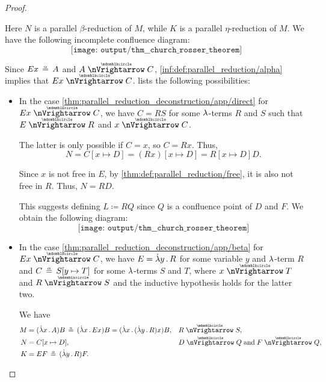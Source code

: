 \begin{proof}
\begin{itemize}
\begin{itemize}
\begin{itemize}
        Here \( N \) is a parallel \( \beta \)-reduction of \( M \), while \( K \) is a parallel \( \eta \)-reduction of \( M \). We have the following incomplete confluence diagram:
        \begin{equation*}
          \texttt{[image: output/thm\_\_church\_rosser\_theorem]}
        \end{equation*}

        Since \( Ex \aequiv A \) and \( A \ppred C \), \ref{inf:def:parallel_reduction/alpha} implies that \( Ex \ppred C \).  lists the following possibilities:
        \begin{itemize}
          \item In the case \cref{thm:parallel_reduction_deconstruction/app/direct} for \( Ex \ppred C \), we have \( C = RS \) for some \( {\mathrm \lambda} \)-terms \( R \) and \( S \) such that \( E \ppred R \) and \( x \ppred C \).

          The latter is only possible if \( C = x \), so \( C = Rx \). Thus,
          \begin{equation*}
            N = C[x \mapsto D] = (Rx)[x \mapsto D] = R[x \mapsto D] D.
          \end{equation*}

          Since \( x \) is not free in \( E \), by \cref{thm:def:parallel_reduction/free}, it is also not free in \( R \). Thus, \( N = RD \).

          This suggests defining \( L \coloneqq RQ \) since \( Q \) is a confluence point of \( D \) and \( F \). We obtain the following diagram:
          \begin{equation*}
            \texttt{[image: output/thm\_\_church\_rosser\_theorem]}
          \end{equation*}

          \item In the case \cref{thm:parallel_reduction_deconstruction/app/beta} for \( Ex \ppred C \), we have \( E = \qabs y R \) for some variable \( y \) and \( {\mathrm \lambda} \)-term \( R \) and \( C \aequiv S[y \mapsto T] \) for some \( {\mathrm \lambda} \)-terms \( S \) and \( T \), where \( x \ppred T \) and \( R \ppred S \) and the inductive hypothesis holds for the latter two.

          We have
          \begin{align*}
            M &= (\qabs x A) B \aequiv (\qabs x E x) B = (\qabs x (\qabs y R) x) B, &&R \ppred S, \\
            N &= C[x \mapsto D],                                                    &&D \ppred Q \T{and} F \ppred Q, \\
            K &= EF \aequiv (\qabs y R) F.                                          &&
          \end{align*}


\end{itemize}
\end{itemize}
\end{itemize}
\end{itemize}
\end{proof}
